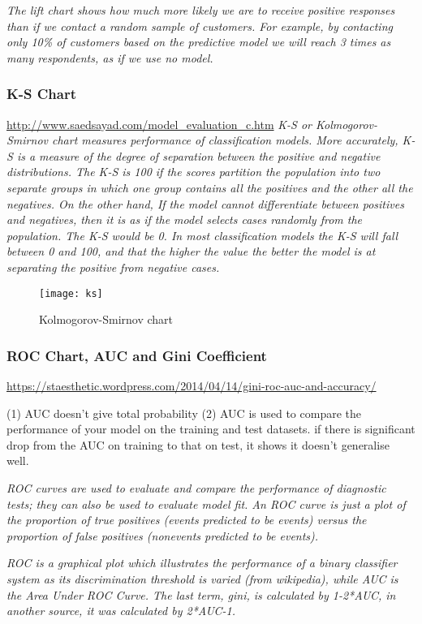 \textit{The lift chart shows how much more likely we are to receive positive responses than if we contact a random sample of customers. For example, by contacting only 10\% of customers based on the predictive model we will reach 3 times as many respondents, as if we use no model.}

\subsubsection{K-S Chart}
\url{http://www.saedsayad.com/model_evaluation_c.htm}
\textit{K-S or Kolmogorov-Smirnov chart measures performance of classification models. More accurately, K-S is a measure of the degree of separation between the positive and negative distributions. The K-S is 100 if the scores partition the population into two separate groups in which one group contains all the positives and the other all the negatives. On the other hand, If the model cannot differentiate between positives and negatives, then it is as if the model selects cases randomly from the population. The K-S would be 0. In most classification models the K-S will fall between 0 and 100, and that the higher the value the better the model is at separating the positive from negative cases.}

\begin{figure}[H]
	\texttt{[image: ks]}
	\caption[Kolmogorov-Smirnov chart ]
	{Kolmogorov-Smirnov chart }
	\label{fig:ks}
\end{figure}



\subsubsection{ROC Chart, AUC and Gini Coefficient}
\url{https://staesthetic.wordpress.com/2014/04/14/gini-roc-auc-and-accuracy/}

(1) AUC doesn't give total probability 
(2) AUC is used to compare the performance of your model on the training and test datasets. if there is significant drop from the AUC on training to that on test, it shows it doesn't generalise well.

\textit{ROC curves are used to evaluate and compare the performance of diagnostic tests; they can also be used to evaluate model fit. An ROC curve is just a plot of the proportion of true positives (events predicted to be events) versus the proportion of false positives (nonevents predicted to be events).}

\textit{ROC is a graphical plot which illustrates the performance of a binary classifier system as its discrimination threshold is varied (from wikipedia), while AUC is the Area Under ROC Curve. The last term, gini, is calculated by 1-2*AUC, in another source, it was calculated by 2*AUC-1.}

